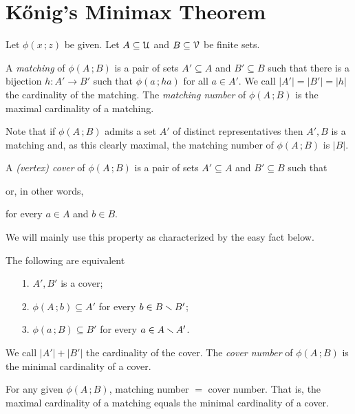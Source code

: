 \documentclass[scombinatorics.tex]{subfiles}
\begin{document}
\section{K\H{o}nig's Minimax Theorem}\label{Konig}

Let $\phi(x\,;z)$ be given. 
Let $A\subseteq\EuScript U$ and $B\subseteq\EuScript V$ be finite sets. 

A \emph{matching\/} of $\phi(A\,;B)$ is a pair of sets $A'\subseteq A$  and $B'\subseteq B$ such that there is a bijection $h:A'\to B'$ such that $\phi(a\,;ha)$ for all $a\in A'$.
We call $|A'|=|B'|=|h|$ the cardinality of the matching.
The \emph{matching number} of $\phi(A\,;B)$ is the maximal cardinality of a matching.

Note that if $\phi(A\,;B)$ admits a set $A'$ of distinct representatives then $A',B$ is a matching and, as this clearly maximal, the matching number of $\phi(A\,;B)$ is $|B|$.

A \emph{(vertex) cover\/} of $\phi(A\,;B)$ is a pair of sets $A'\subseteq A$ and $B'\subseteq B$ such that 


or, in other words,

\hfill for every $a\in A$ and $b\in B$.

We will mainly use this property as characterized by the easy fact below.

\begin{fact}\label{fact_cover}
   The following are equivalent
   \begin{itemize}
      \item[1.] $A',B'$ is a cover;
      \item[2.] $\phi(A\,;b)\subseteq A'$ for every $b\in B\smallsetminus B'$;
      \item[3.] $\phi(a\,;B)\subseteq B'$ for every $a\in A\smallsetminus A'$.\QED
   \end{itemize}
\end{fact}

We call $|A'|+|B'|$ the cardinality of the cover.
The \emph{cover number\/} of $\phi(A\,;B)$ is the minimal cardinality of a cover.


\begin{void_thm}
   For any given  $\phi(A\,;B)$, matching number $=$ cover number.
   That is, the maximal cardinality of a matching equals the minimal cardinality of a cover.
\end{void_thm}
\end{document}
